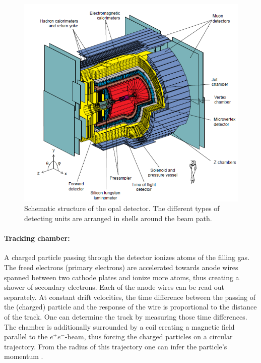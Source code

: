 \begin{figure}[ht]
\centering
\includegraphics[width=1.0\linewidth]{graphics/OPALaufbau}
\caption[Opal schematic build up]{Schematic structure of the opal detector. The different types of detecting units are arranged in shells around the beam path. \cite{cern}}
\label{fig:OPALaufbau}
\end{figure}

\paragraph{Tracking chamber:}
A charged particle passing through the detector ionizes atoms of the filling gas. The freed electrons (primary electrons) are accelerated towards anode wires spanned between two cathode plates and ionize more atoms, thus creating a shower of secondary electrons.
Each of the anode wires can be read out separately. At constant drift velocities, the time difference between the passing of the (charged) particle and the response of the wire is proportional to the distance of the track. One can determine the track by measuring those time differences.
The chamber is additionally surrounded by a coil creating a magnetic field parallel to the $e^+e^-$-beam, thus forcing the charged particles on a circular trajectory. From the radius of this trajectory one can infer the particle's momentum \cite{staatsex}.

